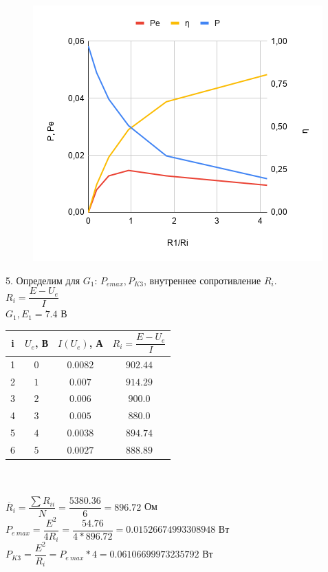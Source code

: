 \begin{figure}[hpt!]
    \centering
    \includegraphics[width=0.6\linewidth]{photo/chart_g2}
\end{figure}

\newpage

5. Определим для $ G_1 $:
$ P_{e max}, P_{K3} $, внутреннее сопротивление $ R_i $.\\

$ R_i = \dfrac{E - U_e}{I} $\\

$ G_1, E_1 = 7.4 $ В

\begin{tabular}{|c|c|c|c|}
    \hline
    i & $ U_e $, В & $ I(U_e) $, А & $ R_i = \dfrac{E - U_e}{I} $\\
    \hline
    1 & $ 0 $ & $ 0.0082 $ & $ 902.44 $\\
    \hline
    2 & $ 1 $ & $ 0.007 $ & $ 914.29 $\\
    \hline
    3 & $ 2 $ & $ 0.006 $ & $ 900.0 $\\
    \hline
    4 & $ 3 $ & $ 0.005 $ & $ 880.0 $\\
    \hline
    5 & $ 4 $ & $ 0.0038 $ & $ 894.74 $\\
    \hline
    6 & $ 5 $ & $ 0.0027 $ & $ 888.89 $\\
    \hline
\end{tabular}
\\
\\

$ \overline R_i = 
\dfrac{\sum R_{i i}}{N} = 
\dfrac{5380.36}{6} = 
896.72
$ Ом
\\

$ P_{e\ max} = 
\dfrac{E^2}{4R_i} = 
\dfrac{54.76}{4 * 896.72} = 
0.01526674993308948
$ Вт
\\

$ P_{K3} = 
\dfrac{E^2}{R_i} = 
P_{e\ max} * 4 = 
0.06106699973235792
$ Вт
\\

